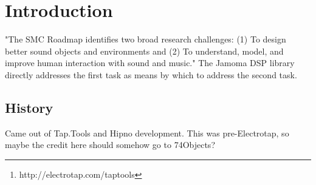 \documentclass[twoside,10pt]{article}
\affiliation{}{}
\title{\papertitle}
\begin{document}
    
\maketitle


\begin{abstract}

This paper presents an object-oriented, reflective, light-weight application programming interface for C++, with an emphasis on real-time signal processing. It makes use of polymorphic typing, dynamic binding, and introspection to create a cross-platform environment pulling ideas from languages such as Smalltalk and Objective-C while remaining within the bounds of the portable and cross-platform C++ context.  The Jamoma Foundation and DSP Library provide a flexible framework and runtime environment, as well as an expanding collection of unit generators for synthesis, processing, and analysis.  This library has been used in both open source and commercial software projects over the past seven years including Electrotap's Tap.Tools\footnote{http://electrotap.com/taptools}, Cycling '74's Hipno\cite{Place:2005}, and the Jamoma Modular Framework\cite{Place:2006}.

\end{abstract}



\section{Introduction} %
\label{sec:introduction}

"The SMC Roadmap identifies two broad research challenges: (1) To design better sound objects and environments and (2) To understand, model, and improve human interaction with sound and music." \cite{serra:2007}  The Jamoma DSP library directly addresses the first task as means by which to address the second task.

\subsection{History}

Came out of Tap.Tools and Hipno development.  This was pre-Electrotap, so maybe the credit here should somehow go to 74Objects?
\end{document}
